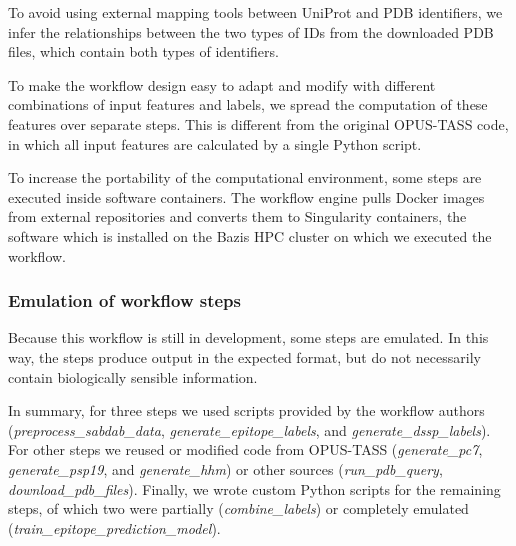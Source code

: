 To avoid using external mapping tools between UniProt and PDB identifiers, we infer the relationships between the two types of IDs from the downloaded PDB files, which contain both types of identifiers. 

To make the workflow design easy to adapt and modify with different combinations of input features and labels, we spread the computation of these features over separate steps. This is different from the original OPUS-TASS code, in which all input features are calculated by a single Python script. 

To increase the portability of the computational environment, some steps are executed inside software containers. The workflow engine pulls Docker images from external repositories and converts them to Singularity \cite{kurtzerSingularityScientificContainers2017} containers, the software which is installed on the Bazis HPC cluster on which we executed the workflow. 

\subsubsection{Emulation of workflow steps} 
Because this workflow is still in development, some steps are emulated. In this way, the steps produce output in the expected format, but do not necessarily contain biologically sensible information. 

In summary, for three steps we used scripts provided by the workflow authors (\emph{preprocess\_sabdab\_data}, \emph{generate\_epitope\_labels}, and \emph{generate\_dssp\_labels}). For other steps we reused or modified code from OPUS-TASS (\emph{generate\_pc7}, \emph{generate\_psp19}, and \emph{generate\_hhm}) or other sources (\emph{run\_pdb\_query}, \emph{download\_pdb\_files}). Finally, we wrote custom Python scripts for the remaining steps, of which two were partially (\emph{combine\_labels}) or completely emulated (\emph{train\_epitope\_prediction\_model}). 